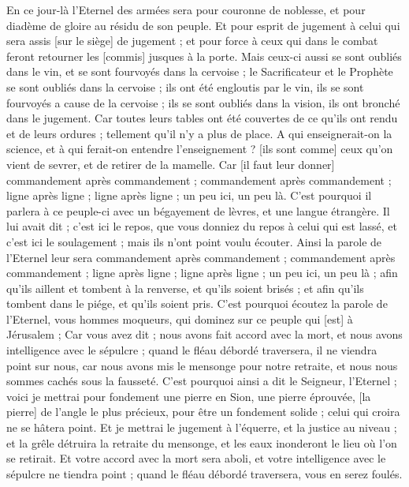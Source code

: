 \begin{multicols}{2}
En ce jour-là l'Eternel des armées sera pour couronne de noblesse, et pour diadème de gloire au résidu de son peuple.
Et pour esprit de jugement à celui qui sera assis [sur le siège] de jugement ; et pour force à ceux qui dans le combat feront retourner les [commis] jusques à la porte.
Mais ceux-ci aussi se sont oubliés dans le vin, et se sont fourvoyés dans la cervoise ; le Sacrificateur et le Prophète se sont oubliés dans la cervoise ; ils ont été engloutis par le vin, ils se sont fourvoyés a cause de la cervoise ; ils se sont oubliés dans la vision, ils ont bronché dans le jugement.
Car toutes leurs tables ont été couvertes de ce qu'ils ont rendu et de leurs ordures ; tellement qu'il n'y a plus de place.
A qui enseignerait-on la science, et à qui ferait-on entendre l'enseignement ? [ils sont comme] ceux qu'on vient de sevrer, et de retirer de la mamelle.
Car [il faut leur donner] commandement après commandement ; commandement après commandement ; ligne après ligne ; ligne après ligne ; un peu ici, un peu là.
C'est pourquoi il parlera à ce peuple-ci avec un bégayement de lèvres, et une langue étrangère.
Il lui avait dit ; c'est ici le repos, que vous donniez du repos à celui qui est lassé, et c'est ici le soulagement ; mais ils n'ont point voulu écouter.
Ainsi la parole de l'Eternel leur sera commandement après commandement ; commandement après commandement ; ligne après ligne ; ligne après ligne ; un peu ici, un peu là ; afin qu'ils aillent et tombent à la renverse, et qu'ils soient brisés ; et afin qu'ils tombent dans le piége, et qu'ils soient pris.
C'est pourquoi écoutez la parole de l'Eternel, vous hommes moqueurs, qui dominez sur ce peuple qui [est] à Jérusalem ;
Car vous avez dit ; nous avons fait accord avec la mort, et nous avons intelligence avec le sépulcre ; quand le fléau débordé traversera, il ne viendra point sur nous, car nous avons mis le mensonge pour notre retraite, et nous nous sommes cachés sous la fausseté.
C'est pourquoi ainsi a dit le Seigneur, l'Eternel ; voici je mettrai pour fondement une pierre en Sion, une pierre éprouvée, [la pierre] de l'angle le plus précieux, pour être un fondement solide ; celui qui croira ne se hâtera point.
Et je mettrai le jugement à l'équerre, et la justice au niveau ; et la grêle détruira la retraite du mensonge, et les eaux inonderont le lieu où l'on se retirait.
Et votre accord avec la mort sera aboli, et votre intelligence avec le sépulcre ne tiendra point ; quand le fléau débordé traversera, vous en serez foulés.

\end{multicols}
